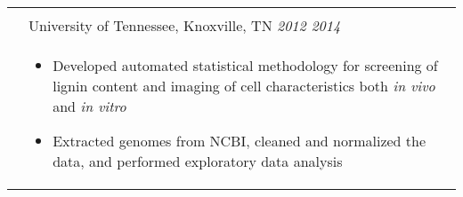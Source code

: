 \documentclass[10pt]{article}
\begin{document}
\begin{minipage}[ht]{.8\linewidth}
\begin{tabularx}{\linewidth}{p{1.8cm}M}
   &  \\
   & University of Tennessee, Knoxville, TN \textit{2012 \textemdash{} 2014} \\
   & \begin{itemize}[topsep=-12pt,parsep=0em]
        \setlength\itemsep{0em}
        \item Developed automated statistical methodology for screening of lignin content and imaging of cell characteristics both \textit{in vivo} and \textit{in vitro} %
        \item Extracted genomes from NCBI, cleaned and normalized the data, and performed exploratory data analysis
     \end{itemize} \\
  \end{tabularx} %
\end{minipage}%
\end{document}

